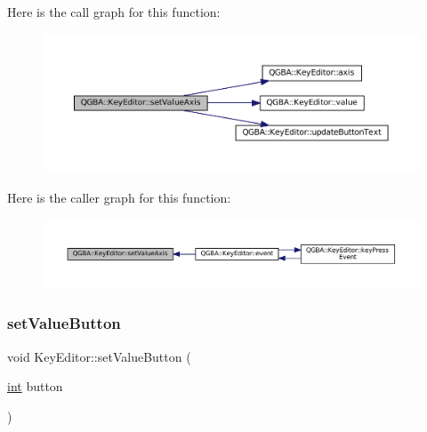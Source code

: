 Here is the call graph for this function\+:
\nopagebreak
\begin{figure}[H]
\begin{center}
\leavevmode
\includegraphics[width=350pt]{class_q_g_b_a_1_1_key_editor_a55a17cb898ce452a4060355fbe431371_cgraph}
\end{center}
\end{figure}
Here is the caller graph for this function\+:
\nopagebreak
\begin{figure}[H]
\begin{center}
\leavevmode
\includegraphics[width=350pt]{class_q_g_b_a_1_1_key_editor_a55a17cb898ce452a4060355fbe431371_icgraph}
\end{center}
\end{figure}
\mbox{\label{class_q_g_b_a_1_1_key_editor_ac4369964864ef0df3e9455ab444bbc3b}} 
\subsubsection{\texorpdfstring{set\+Value\+Button}{setValueButton}}
{\footnotesize\ttfamily void Key\+Editor\+::set\+Value\+Button (\begin{DoxyParamCaption}\item[{\mbox{\hyperlink{ioapi_8h_a787fa3cf048117ba7123753c1e74fcd6}{int}}}]{button }\end{DoxyParamCaption})\hspace{0.3cm}{\ttfamily [slot]}}

